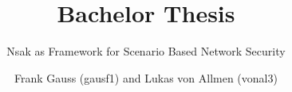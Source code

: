 \documentclass[
  a4paper,
  BCOR=15mm,            %
  twoside=false,        %
  open=any,             %
  bibliography=totoc,   %
  listof=totoc,         %
  monolingual,
  invert-title,
]{bfhthesis}
\begin{document}

\frontmatter

\title{Bachelor Thesis}
\subtitle{Nsak as Framework for Scenario Based Network Security}
\author{Frank Gauss (gausf1) and Lukas von Allmen (vonal3)}



\maketitle


\tableofcontents

\mainmatter











\end{document}

